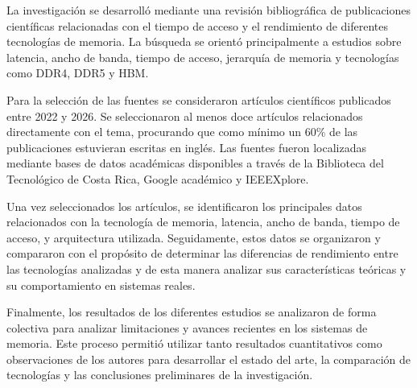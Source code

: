 
La investigación se desarrolló mediante una revisión bibliográfica de
publicaciones científicas relacionadas con el tiempo de acceso y el rendimiento
de diferentes tecnologías de memoria. La búsqueda se orientó principalmente a
estudios sobre latencia, ancho de banda, tiempo de acceso, jerarquía de memoria
y tecnologías como DDR4, DDR5 y HBM.

Para la selección de las fuentes se consideraron artículos científicos
publicados entre 2022 y 2026. Se seleccionaron al menos doce artículos
relacionados directamente con el tema, procurando que como mínimo un 60\% de
las publicaciones estuvieran escritas en inglés. Las fuentes fueron localizadas
mediante bases de datos académicas disponibles a través de la Biblioteca del
Tecnológico de Costa Rica, Google académico y IEEEXplore.

Una vez seleccionados los artículos, se identificaron los principales datos
relacionados con la tecnología de memoria, latencia, ancho de
banda, tiempo de acceso, y arquitectura utilizada. Seguidamente, estos datos se 
organizaron y compararon con el propósito de determinar las diferencias de rendimiento 
entre las tecnologías analizadas y de esta manera analizar sus características teóricas y 
su comportamiento en sistemas reales.

Finalmente, los resultados de los diferentes estudios se analizaron de forma
colectiva para analizar limitaciones y avances recientes en los
sistemas de memoria. Este proceso permitió utilizar tanto resultados
cuantitativos como observaciones de los autores para desarrollar el estado del
arte, la comparación de tecnologías y las conclusiones preliminares de la
investigación.
